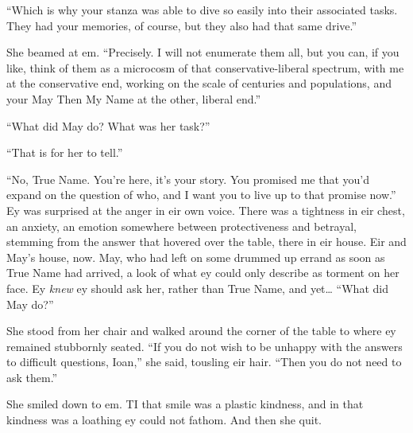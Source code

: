 ``Which is why your stanza was able to dive so easily into their associated tasks. They had your memories, of course, but they also had that same drive.''

She beamed at em. ``Precisely. I will not enumerate them all, but you can, if you like, think of them as a microcosm of that conservative-liberal spectrum, with me at the conservative end, working on the scale of centuries and populations, and your May Then My Name at the other, liberal end.''

``What did May do? What was her task?''

``That is for her to tell.''

``No, True Name. You're here, it's your story. You promised me that you'd expand on the question of who, and I want you to live up to that promise now.'' Ey was surprised at the anger in eir own voice. There was a tightness in eir chest, an anxiety, an emotion somewhere between protectiveness and betrayal, stemming from the answer that hovered over the table, there in eir house. Eir and May's house, now. May, who had left on some drummed up errand as soon as True Name had arrived, a look of what ey could only describe as torment on her face. Ey \emph{knew} ey should ask her, rather than True Name, and yet\ldots{} ``What did May do?''

She stood from her chair and walked around the corner of the table to where ey remained stubbornly seated. ``If you do not wish to be unhappy with the answers to difficult questions, Ioan,'' she said, tousling eir hair. ``Then you do not need to ask them.''

She smiled down to em. TI that smile was a plastic kindness, and in that kindness was a loathing ey could not fathom. And then she quit.
